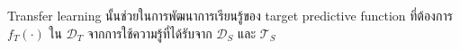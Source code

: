 Transfer learning  นั้นช่วยในการพัฒนาการเรียนรู้ของ target predictive function ที่ต้องการ ${\displaystyle f_{T}(\cdot )}$ ใน ${\mathcal{D}_{T}}$
จากการใช้ความรู้ที่ได้รับจาก ${\displaystyle {\mathcal {D}}_{S}}$ และ ${\displaystyle {\mathcal {T}}_{S}}$








